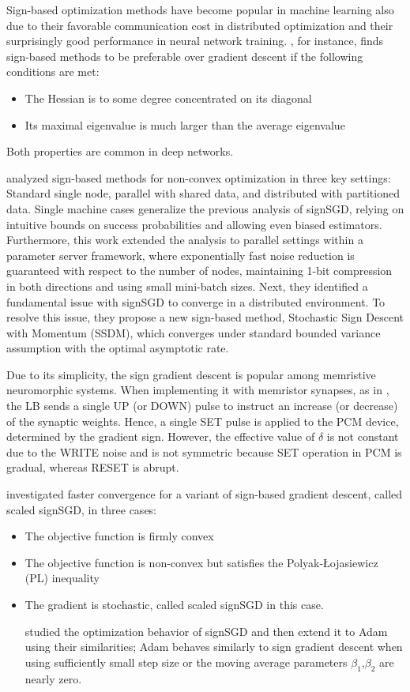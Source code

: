 \documentclass[11pt]{book}
\begin{document}
Sign-based optimization methods have become popular in machine learning
also due to their favorable communication cost in distributed optimization
and their surprisingly good performance in neural network training.
\cite{balles2020geometry}, for instance, finds sign-based methods to be preferable
over gradient descent if the following conditions are met:
\begin{itemize}
\item The Hessian is to some degree concentrated on its diagonal
\item Its maximal eigenvalue is much larger than the average eigenvalue
\end{itemize}
Both properties are common in deep networks.

\cite{safaryan2021stochastic} analyzed sign-based methods for non-convex
optimization in three key settings: Standard single node, parallel
with shared data, and distributed with partitioned data. Single machine
cases generalize the previous analysis of signSGD, relying on intuitive
bounds on success probabilities and allowing even biased estimators.
Furthermore, this work extended the analysis to parallel settings
within a parameter server framework, where exponentially fast noise
reduction is guaranteed with respect to the number of nodes, maintaining
1-bit compression in both directions and using small mini-batch sizes.
Next, they identified a fundamental issue with signSGD to converge
in a distributed environment. To resolve this issue, they propose
a new sign-based method, Stochastic Sign Descent with Momentum (SSDM),
which converges under standard bounded variance assumption with the
optimal asymptotic rate.

Due to its simplicity, the sign gradient descent is popular among
memristive neuromorphic systems. When implementing it with memristor
synapses, as in \cite{demirag2021online}, the LB sends a single UP
(or DOWN) pulse to instruct an increase (or decrease) of the synaptic
weights. Hence, a single SET pulse is applied to the PCM device, determined
by the gradient sign. However, the effective value of $\delta$ is
not constant due to the WRITE noise and is not symmetric because SET
operation in PCM is gradual, whereas RESET is abrupt.

\cite{li2021faster} investigated faster convergence for a variant
of sign-based gradient descent, called scaled signSGD, in three cases:
\begin{itemize}
\item The objective function is firmly convex
\item The objective function is non-convex but satisfies the Polyak-Łojasiewicz
(PL) inequality
\item The gradient is stochastic, called scaled signSGD in this case.

\cite{zou2021understanding} studied the optimization behavior of
signSGD and then extend it to Adam using their similarities; Adam
behaves similarly to sign gradient descent when using sufficiently
small step size or the moving average parameters $\beta_{1}$,$\beta_{2}$
are nearly zero.
\end{itemize}
\end{document}
